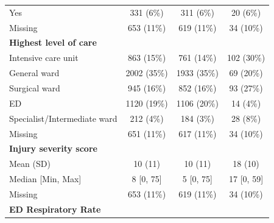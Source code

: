 \documentclass[12pt, a4paper]{article}
\begin{document}
\begin{table}[p]
{\begin{tabular}{lccc}
            \hspace{3mm}Yes                               & 331 (6\%)         & 311 (6\%)         & 20 (6\%)         \\
            \hspace{3mm}Missing                           & 653 (11\%)        & 619 (11\%)        & 34 (10\%)        \\
            \textbf{Highest level of care}                &                   &                   &                  \\
            \hspace{3mm}Intensive care unit               & 863 (15\%)        & 761 (14\%)        & 102 (30\%)       \\
            \hspace{3mm}General ward                      & 2002 (35\%)       & 1933 (35\%)       & 69 (20\%)        \\
            \hspace{3mm}Surgical ward                     & 945 (16\%)        & 852 (16\%)        & 93 (27\%)        \\
            \hspace{3mm}ED                                & 1120 (19\%)       & 1106 (20\%)       & 14 (4\%)         \\
            \hspace{3mm}Specialist/Intermediate ward      & 212 (4\%)         & 184 (3\%)         & 28 (8\%)         \\
            \hspace{3mm}Missing                           & 651 (11\%)        & 617 (11\%)        & 34 (10\%)        \\
            \textbf{Injury severity score}                &                   &                   &                  \\
            \hspace{3mm}Mean (SD)                         & 10 (11)           & 10 (11)           & 18 (10)          \\
            \hspace{3mm}Median [Min, Max]                 & 8 [0, 75]         & 5 [0, 75]         & 17 [0, 59]       \\
            \hspace{3mm}Missing                           & 653 (11\%)        & 619 (11\%)        & 34 (10\%)        \\
            \textbf{ED Respiratory Rate}                  &                   &                   &                  \\

\end{tabular}}
\end{table}
\end{document}
